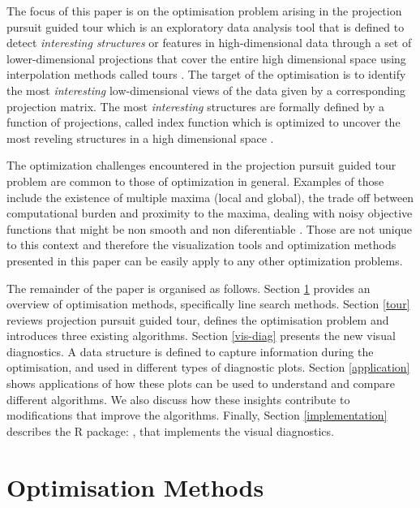 The focus of this paper is on the optimisation problem arising in the
projection pursuit guided tour \citep{buja2005computational} which is an
exploratory data analysis tool that is defined to detect
\emph{interesting structures} or features in high-dimensional data
through a set of lower-dimensional projections that cover the entire
high dimensional space using interpolation methods called tours
\citep{cook2008grand}. The target of the optimisation is to identify the
most \emph{interesting} low-dimensional views of the data given by a
corresponding projection matrix. The most \emph{interesting} structures
are formally defined by a function of projections, called index function
which is optimized to uncover the most reveling structures in a high
dimensional space \citep{cook1993projection}.

The optimization challenges encountered in the projection pursuit guided
tour problem are common to those of optimization in general. Examples of
those include the existence of multiple maxima (local and global), the
trade off between computational burden and proximity to the maxima,
dealing with noisy objective functions that might be non smooth and non
diferentiable \citep{jones1998efficient}. Those are not unique to this
context and therefore the visualization tools and optimization methods
presented in this paper can be easily apply to any other optimization
problems.

The remainder of the paper is organised as follows. Section \ref{optim}
provides an overview of optimisation methods, specifically line search
methods. Section \ref{tour} reviews projection pursuit guided tour,
defines the optimisation problem and introduces three existing
algorithms. Section \ref{vis-diag} presents the new visual diagnostics.
A data structure is defined to capture information during the
optimisation, and used in different types of diagnostic plots. Section
\ref{application} shows applications of how these plots can be used to
understand and compare different algorithms. We also discuss how these
insights contribute to modifications that improve the algorithms.
Finally, Section \ref{implementation} describes the R package:
, that implements the visual diagnostics.

\hypertarget{optim}{%
\section{Optimisation Methods}\label{optim}}


